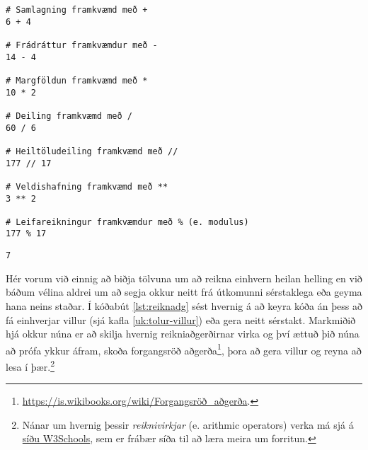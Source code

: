 \begin{lstlisting}[caption=Reikniaðgerðir, label=lst:reiknadg]
# Samlagning framkvæmd með + 
6 + 4 

# Frádráttur framkvæmdur með -
14 - 4 

# Margföldun framkvæmd með * 
10 * 2 

# Deiling framkvæmd með / 
60 / 6 

# Heiltöludeiling framkvæmd með //
177 // 17

# Veldishafning framkvæmd með **
3 ** 2

# Leifareikningur framkvæmdur með % (e. modulus)
177 % 17
\end{lstlisting}
\lstset{style=uttak}
\begin{lstlisting}
7
\end{lstlisting}
\lstset{style=venjulegt}

Hér vorum við einnig að biðja tölvuna um að reikna einhvern heilan helling en við báðum vélina aldrei um að segja okkur neitt frá útkomunni sérstaklega eða geyma hana neins staðar.
Í kóðabút \ref{lst:reiknadg} sést hvernig á að keyra kóða án þess að fá einhverjar villur (sjá kafla \ref{uk:tolur-villur}) eða gera neitt sérstakt.
Markmiðið hjá okkur núna er að skilja hvernig reikniaðgerðirnar virka og því ættuð þið núna að prófa ykkur áfram, skoða forgangsröð aðgerða\footnote{\href{https://is.wikibooks.org/wiki/Forgangsr\%C3\%B6\%C3\%B0\_a\%C3\%B0ger\%C3\%B0a}{https://is.wikibooks.org/wiki/Forgangsröð\_aðgerða}.}, þora að gera villur og reyna að lesa í þær.\footnote{Nánar um hvernig þessir \emph{reiknivirkjar} (e. arithmic operators) verka má sjá á \href{https://www.w3schools.com/python/gloss_python_arithmetic_operators.asp}{síðu W3Schools}, sem er frábær síða til að læra meira um forritun.}

